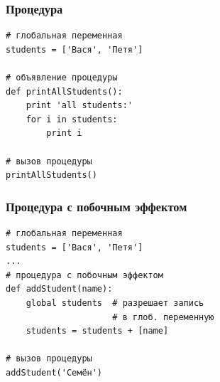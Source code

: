 {  



\begin{frame}[fragile]
  \frametitle{Процедура}
  \begin{verbatim}
# глобальная переменная
students = ['Вася', 'Петя']

# объявление процедуры
def printAllStudents():
    print 'all students:'
    for i in students:
        print i

# вызов процедуры
printAllStudents()
  \end{verbatim}
\end{frame}

\begin{frame}[fragile]
  \frametitle{Процедура с побочным эффектом}
  \begin{verbatim}
# глобальная переменная
students = ['Вася', 'Петя']
...
# процедура с побочным эффектом
def addStudent(name):
    global students  # разрешает запись
                     # в глоб. переменную
    students = students + [name]

# вызов процедуры
addStudent('Семён')
  \end{verbatim}
\end{frame}

}

